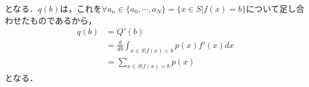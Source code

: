 \documentclass[dvipdfmx]{jsarticle}
\begin{document}
となる．$q\left(b\right)$は，これを$\forall a_n\in\{a_0,\cdots,a_N\}=\{x\in S|f\left(x\right)=b\}$について足し合わせたものであるから，
 \begin{align}
q\left(b\right)&=Q'\left(b\right)\nonumber\\
&=\frac{d}{db}\int_{x\in S|f\left(x\right)<b}p\left(x\right)f'\left(x\right)dx\nonumber\\
&=\sum_{x\in S|f\left(x\right)=b}p\left(x\right)
 \end{align}
となる．
\end{document}
